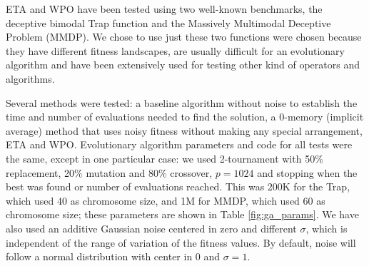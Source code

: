 \documentclass{llncs}
\begin{document}
ETA and WPO have been tested using two well-known benchmarks, the deceptive bimodal Trap \cite{deb1992analyzing}
function and the Massively Multimodal Deceptive Problem \cite{goldberg92massive} (MMDP). 
We chose to use just these two functions were chosen
because they have different fitness landscapes, are usually difficult
for an evolutionary algorithm and have been extensively used for
testing other kind of operators and algorithms.

Several methods were tested: a baseline algorithm without
noise to establish the time and number of evaluations
needed to find the solution, a 0-memory (implicit average) method that
uses noisy fitness without making any special arrangement, ETA and
WPO. Evolutionary algorithm parameters and code for all tests were the
same, except in one
particular case: we used 2-tournament with 50\% replacement, 20\%
mutation and 80\% crossover, $p=1024$ and stopping when the best was
found or number of evaluations reached. This was 200K for the Trap,
which used 40 as chromosome size, and 1M for MMDP, which used 60 as
chromosome size; these parameters are shown in Table \ref{fig:ga_params}. We have also used an additive Gaussian noise centered in zero
and different $\sigma$, which is independent of the range of variation of the fitness values. By default, noise will follow a normal distribution with center in 0 and $\sigma=1$.
\end{document}
